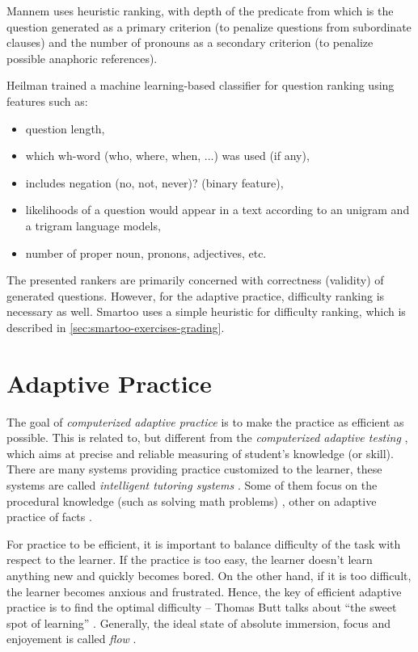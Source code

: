 \documentclass[a4paper, 12pt, twoside]{fithesis2}		%
\renewcommand{\_}{\leavevmode \kern0.07em\vbox{\hrule width0.4em}}
\newcommand{\squarebullet}{\textcolor{black}{\raisebox{0.15em}{\rule{4pt}{4pt}}}}
\newcommand{\emptysquarebullet}{\textcolor{black}{\raisebox{0.10em}{\tiny$\square$}}}
\newenvironment{myItemize}{
  \begin{itemize}[leftmargin=2em,rightmargin=1em,itemsep=\parskip ,parsep=0em,topsep=0em,partopsep=0em]
  \renewcommand{\labelitemi}{\squarebullet}
  \renewcommand{\labelitemii}{\textbullet}
}{
  \end{itemize}
}
\begin{document}
Mannem \cite{question-gen-mannem} uses heuristic ranking,
with depth of the predicate from which is the question generated as a primary criterion
(to penalize questions from subordinate clauses)
and the number of pronouns as a secondary criterion (to penalize possible anaphoric references).

Heilman \cite{question-gen-heilman} trained a machine learning-based classifier for question ranking using features such as:
\begin{myItemize}
\item question length,
\item which wh-word (who, where, when, ...) was used (if any),
\item includes negation (no, not, never)? (binary feature),
\item likelihoods of a question would appear in a text according to an unigram and a trigram language models,
\item number of proper noun, pronons, adjectives, etc.
\end{myItemize}

The presented rankers are primarily concerned with correctness (validity) of generated questions.
However, for the adaptive practice, difficulty ranking is necessary as well.
Smartoo uses a simple heuristic for difficulty ranking, which is described in \autoref{sec:smartoo-exercises-grading}.


\chapter{Adaptive Practice}
\label{chap:practice}

The goal of \emph{computerized adaptive practice} \cite{adaptive-practice-irt-math}
is to make the practice as efficient as possible.
This is related to, but different from the \emph{computerized adaptive testing} \cite{computerized-adaptive-testing},
which aims at precise and reliable measuring of student's knowledge (or skill).
There are many systems providing practice customized to the learner,
these systems are called \emph{intelligent tutoring systems} \cite{tutoring-systems-behavior}.
Some of them focus on the procedural knowledge (such as solving math problems) \cite{adaptive-practice-irt-math},
other on adaptive practice of facts \cite{slepe-mapy}.

For practice to be efficient, it is important to balance difficulty of the task with respect to the learner.
If the practice is too easy, the learner doesn't learn anything new and quickly becomes bored.
On the other hand, if it is too difficult, the learner becomes anxious and frustrated.
Hence, the key of efficient adaptive practice is to find the optimal difficulty --
Thomas Butt talks about ``the sweet spot of learning'' \cite{adaptive-practice}.
Generally, the ideal state of absolute immersion, focus and enjoyement is called \emph{flow} \cite{flow}.
\end{document}
